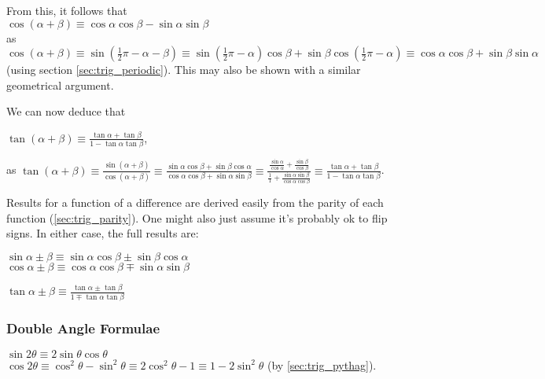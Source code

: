 \documentclass[a4paper,11pt]{article}
\begin{document}
    From this, it follows that
    \\$\cos(\alpha + \beta) \equiv
       \cos \alpha \cos \beta - \sin \alpha \sin \beta$
    \\as $\cos(\alpha + \beta) \equiv \sin(\frac 12 \pi - \alpha - \beta) \equiv
        \sin(\frac 12 \pi - \alpha)\cos \beta +
        \sin \beta \cos(\frac 12 \pi - \alpha) \equiv
        \cos \alpha \cos \beta + \sin \beta \sin \alpha$
    (using section \ref{sec:trig_periodic}). This may also be shown
    with a similar geometrical argument.

    We can now deduce that

    $\displaystyle \tan(\alpha + \beta) \equiv
        \frac{\tan \alpha + \tan \beta}{1 - \tan \alpha \tan \beta}$,

    as $\displaystyle\tan(\alpha + \beta) \equiv
        \frac{\sin(\alpha + \beta)}{\cos(\alpha + \beta)} \equiv
        \frac{\sin \alpha \cos \beta + \sin \beta \cos \alpha}
             {\cos \alpha \cos \beta + \sin \alpha \sin \beta} \equiv
        \frac{\frac{\sin \alpha}{\cos \alpha} + \frac{\sin \beta}{\cos \beta}}
             {\frac 11 + \frac{\sin \alpha \sin \beta}{\cos \alpha \cos \beta}}
             \equiv
        \frac{\tan \alpha + \tan \beta}{1 - \tan \alpha \tan \beta}$.

    Results for a function of a difference are derived easily from the parity of
    each function (\ref{sec:trig_parity}). One might also just assume it's
    probably ok to flip signs. In either case, the full results are:

    $\sin \alpha \pm \beta \equiv
       \sin \alpha \cos \beta \pm \sin \beta \cos \alpha$
    \\$\cos \alpha \pm \beta \equiv
       \cos \alpha \cos \beta \mp \sin \alpha \sin \beta$

    $\displaystyle \tan \alpha \pm \beta \equiv
        \frac{\tan \alpha \pm \tan \beta}{1 \mp \tan \alpha \tan \beta}$

    \subsubsection{Double Angle Formulae} \label{sec:trig_double_angle}

    $\sin 2\theta \equiv
       2\sin \theta \cos \theta$
    \\$\cos 2\theta \equiv
       \cos^2 \theta - \sin^2 \theta \equiv
       2\cos^2 \theta - 1 \equiv 1 - 2\sin^2 \theta$ (by \ref{sec:trig_pythag}).
\end{document}
